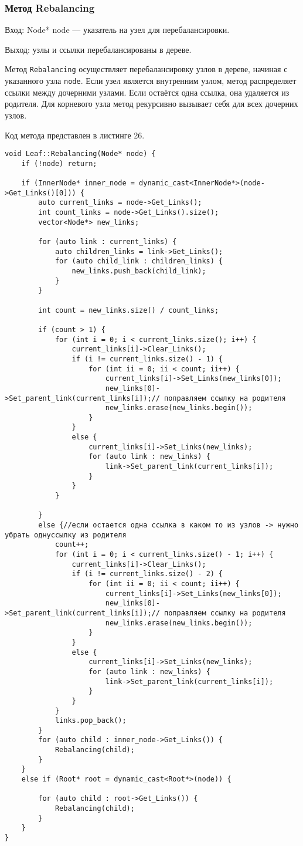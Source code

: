 \documentclass[10pt,a4paper,final]{article} %
\begin{document}
\subsubsection{Метод Rebalancing} 
Вход: Node* node — указатель на узел для перебалансировки. \par
Выход: узлы и ссылки перебалансированы в дереве. \par
\par Метод \texttt{Rebalancing} осуществляет перебалансировку узлов в дереве, начиная с указанного узла \texttt{node}. Если узел является внутренним узлом, метод распределяет ссылки между дочерними узлами. Если остаётся одна ссылка, она удаляется из родителя. Для корневого узла метод рекурсивно вызывает себя для всех дочерних узлов.

Код метода представлен в листинге 26. \begin{lstlisting}[label=rebalancingLeafMethod, caption = Метод Rebalancing для класса Leaf] 
void Leaf::Rebalancing(Node* node) {
	if (!node) return;
	
	if (InnerNode* inner_node = dynamic_cast<InnerNode*>(node->Get_Links()[0])) {
		auto current_links = node->Get_Links();
		int count_links = node->Get_Links().size();
		vector<Node*> new_links;
		
		for (auto link : current_links) {
			auto children_links = link->Get_Links();
			for (auto child_link : children_links) {
				new_links.push_back(child_link);
			}
		}
		
		int count = new_links.size() / count_links;
		
		if (count > 1) {
			for (int i = 0; i < current_links.size(); i++) {
				current_links[i]->Clear_Links();
				if (i != current_links.size() - 1) {
					for (int ii = 0; ii < count; ii++) {
						current_links[i]->Set_Links(new_links[0]);
						new_links[0]->Set_parent_link(current_links[i]);// поправляем ссылку на родителя
						new_links.erase(new_links.begin());
					}
				}
				else {
					current_links[i]->Set_Links(new_links);
					for (auto link : new_links) {
						link->Set_parent_link(current_links[i]);
					}
				}
			}
			
		}
		else {//если остается одна ссылка в каком то из узлов -> нужно убрать однуссылку из родителя
			count++;
			for (int i = 0; i < current_links.size() - 1; i++) {
				current_links[i]->Clear_Links();
				if (i != current_links.size() - 2) {
					for (int ii = 0; ii < count; ii++) {
						current_links[i]->Set_Links(new_links[0]);
						new_links[0]->Set_parent_link(current_links[i]);// поправляем ссылку на родителя
						new_links.erase(new_links.begin());
					}
				}
				else {
					current_links[i]->Set_Links(new_links);
					for (auto link : new_links) {
						link->Set_parent_link(current_links[i]);
					}
				}
			}
			links.pop_back();
		}
		for (auto child : inner_node->Get_Links()) {
			Rebalancing(child);
		}
	}
	else if (Root* root = dynamic_cast<Root*>(node)) {
		
		for (auto child : root->Get_Links()) {
			Rebalancing(child);
		}
	}
}\end{lstlisting}
\end{document}
